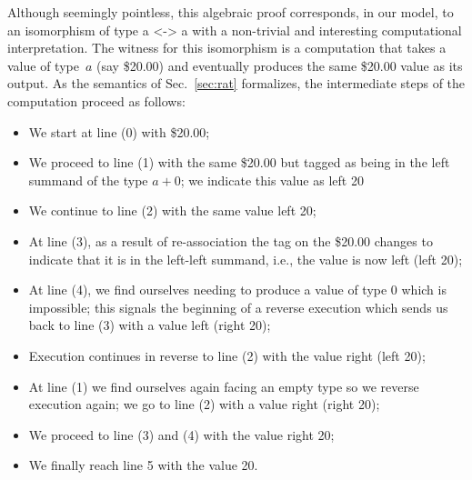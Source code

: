 \documentclass[preprint]{sigplanconf}
\begin{document}
Although seemingly pointless, this algebraic proof corresponds, in our model,
to an isomorphism of type {{a <-> a}} with a non-trivial and interesting
computational interpretation. The witness for this isomorphism is a
computation that takes a value of type~$a$ (say \$20.00) and eventually
produces the same \$20.00 value as its output. As the semantics of
Sec.~\ref{sec:rat} formalizes, the intermediate steps of the computation
proceed as follows:
\begin{itemize}
\item We start at line (0) with \$20.00; 
\item We proceed to line (1) with the same \$20.00 but tagged as being in the
  left summand of the type $a+0$; we indicate this value as {{left 20}}
\item We continue to line (2) with the same value {{left 20}};
\item At line (3), as a result of re-association the tag on the \$20.00
  changes to indicate that it is in the left-left summand, i.e., the value is
  now {{left (left 20)}};
\item At line (4), we find ourselves needing to produce a value of type 0
  which is impossible; this signals the beginning of a reverse execution
  which sends us back to line (3) with a value {{left (right 20)}};
\item Execution continues in reverse to line (2) with the value 
  {{right (left 20)}};
\item At line (1) we find ourselves again facing an empty type so we reverse
  execution again; we go to line (2) with a value {{right (right 20)}};
\item We proceed to line (3) and (4) with the value {{right 20}};
\item We finally reach line 5 with the value {{20}}.
\end{itemize}
\end{document}
